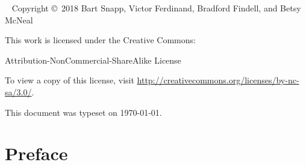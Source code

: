 \newpage

\begin{fullwidth}
~\vfill
\thispagestyle{empty}
\setlength{\parindent}{0pt}
\setlength{\parskip}{\baselineskip}
Copyright \copyright~2018 Bart Snapp, Victor Ferdinand, Bradford Findell, and Betsy McNeal

\vspace{.5cm}

\noindent
This work is licensed under the Creative Commons:
\begin{center}
Attribution-NonCommercial-ShareAlike License 
\end{center}
To view a copy of this license, visit \url{http://creativecommons.org/licenses/by-nc-sa/3.0/}.

\vspace{.5cm}
\noindent This document was typeset on \today.
\end{fullwidth}


\chapter*{Preface}


